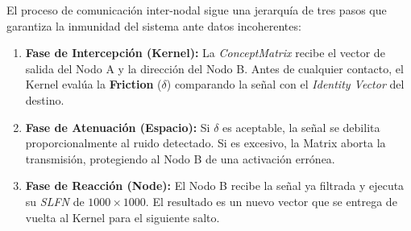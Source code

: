\documentclass[12pt]{article}
\begin{document}
El proceso de comunicación inter-nodal sigue una jerarquía de tres pasos que garantiza la inmunidad del sistema ante datos incoherentes:

\begin{enumerate}
	\item \textbf{Fase de Intercepción (Kernel):} La \textit{ConceptMatrix} recibe el vector de salida del Nodo A y la dirección del Nodo B. Antes de cualquier contacto, el Kernel evalúa la \textbf{Friction} ($\delta$) comparando la señal con el \textit{Identity Vector} del destino.
	\item \textbf{Fase de Atenuación (Espacio):} Si $\delta$ es aceptable, la señal se debilita proporcionalmente al ruido detectado. Si es excesivo, la Matrix aborta la transmisión, protegiendo al Nodo B de una activación errónea.
	\item \textbf{Fase de Reacción (Node):} El Nodo B recibe la señal ya filtrada y ejecuta su \textit{SLFN} de $1000 \times 1000$. El resultado es un nuevo vector que se entrega de vuelta al Kernel para el siguiente salto.
\end{enumerate}
\end{document}
